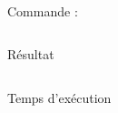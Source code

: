 \documentclass{article}
\begin{document}
\paragraph{}
Commande :
\begin{verbatim}
\end{verbatim}
Résultat
 \begin{verbatim}
\end{verbatim}
Temps d'exécution
\begin{verbatim}
\end{verbatim}
\end{document}
